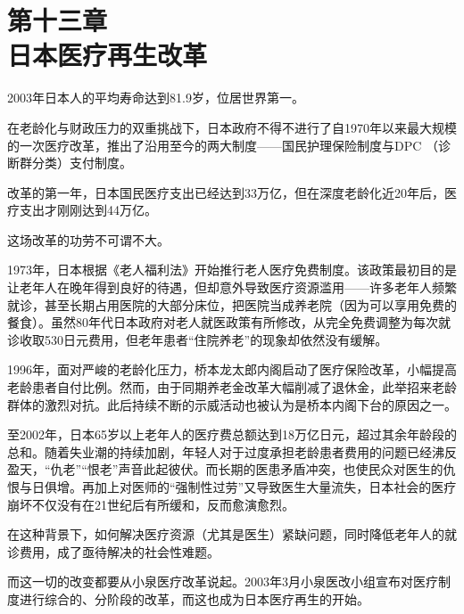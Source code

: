 

\section[第十三章\q 日本医疗再生改革]{第十三章\\ 日本医疗再生改革}


{\fangsong 2003年日本人的平均寿命达到81.9岁，位居世界第一。\par}

{\fangsong 在老龄化与财政压力的双重挑战下，日本政府不得不进行了自1970年以来最大规模的一次医疗改革，推出了沿用至今的两大制度——国民护理保险制度与DPC （诊断群分类）支付制度。\par}

{\fangsong 改革的第一年，日本国民医疗支出已经达到33万亿，但在深度老龄化近20年后，医疗支出才刚刚达到44万亿。\par}

{\fangsong 这场改革的功劳不可谓不大。\par}

1973年，日本根据《老人福利法》开始推行老人医疗免费制度。该政策最初目的是让老年人在晚年得到良好的待遇，但却意外导致医疗资源滥用——许多老年人频繁就诊，甚至长期占用医院的大部分床位，把医院当成养老院（因为可以享用免费的餐食）。虽然80年代日本政府对老人就医政策有所修改，从完全免费调整为每次就诊收取530日元费用，但老年患者“住院养老”的现象却依然没有缓解。

1996年，面对严峻的老龄化压力，桥本龙太郎内阁启动了医疗保险改革，小幅提高老龄患者自付比例。然而，由于同期养老金改革大幅削减了退休金，此举招来老龄群体的激烈对抗。此后持续不断的示威活动也被认为是桥本内阁下台的原因之一。

至2002年，日本65岁以上老年人的医疗费总额达到18万亿日元，超过其余年龄段的总和。随着失业潮的持续加剧，年轻人对于过度承担老龄患者费用的问题已经沸反盈天，“仇老”“恨老”声音此起彼伏。而长期的医患矛盾冲突，也使民众对医生的仇恨与日俱增。再加上对医师的“强制性过劳”又导致医生大量流失，日本社会的医疗崩坏不仅没有在21世纪后有所缓和，反而愈演愈烈。

在这种背景下，如何解决医疗资源（尤其是医生）紧缺问题，同时降低老年人的就诊费用，成了亟待解决的社会性难题。

而这一切的改变都要从小泉医疗改革说起。2003年3月小泉医改小组宣布对医疗制度进行综合的、分阶段的改革，而这也成为日本医疗再生的开始。

